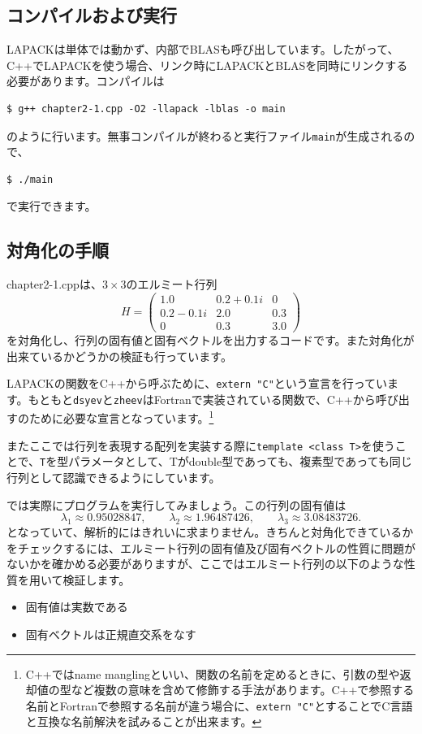 \documentclass[12pt]{jreport}
\begin{document}
\subsection{コンパイルおよび実行}
LAPACKは単体では動かず、内部でBLASも呼び出しています。したがって、C++でLAPACKを使う場合、リンク時にLAPACKとBLASを同時にリンクする必要があります。コンパイルは
\begin{lstlisting}[style=terminal]
  $ g++ chapter2-1.cpp -O2 -llapack -lblas -o main
\end{lstlisting}
のように行います。無事コンパイルが終わると実行ファイル\texttt{main}が生成されるので、
\begin{lstlisting}[style=terminal]
  $ ./main
\end{lstlisting}
で実行できます。

\subsection{対角化の手順}
chapter2-1.cppは、$3\times3$のエルミート行列
\begin{equation}
  H =
\begin{pmatrix}
1.0 & 0.2 + 0.1 i & 0 \\
0.2 - 0.1 i & 2.0 & 0.3 \\
0 & 0.3 & 3.0
\end{pmatrix}
\end{equation}
を対角化し、行列の固有値と固有ベクトルを出力するコードです。また対角化が出来ているかどうかの検証も行っています。

LAPACKの関数をC++から呼ぶために、\texttt{extern "C"}という宣言を行っています。もともと\texttt{dsyev}と\texttt{zheev}はFortranで実装されている関数で、C++から呼び出すのために必要な宣言となっています。\footnote[1]{C++ではname manglingといい、関数の名前を定めるときに、引数の型や返却値の型など複数の意味を含めて修飾する手法があります。C++で参照する名前とFortranで参照する名前が違う場合に、\texttt{extern "C"}とすることでC言語と互換な名前解決を試みることが出来ます。}

またここでは行列を表現する配列を実装する際に\texttt{template <class T>}を使うことで、\texttt{T}を型パラメータとして、Tがdouble型であっても、複素型であっても同じ行列として認識できるようにしています。


では実際にプログラムを実行してみましょう。この行列の固有値は
\begin{equation*}
  \lambda_1 \approx 0.95028847,\qquad
\lambda_2 \approx 1.96487426,\qquad
\lambda_3 \approx 3.08483726 .
\end{equation*}
となっていて、解析的にはきれいに求まりません。きちんと対角化できているかをチェックするには、エルミート行列の固有値及び固有ベクトルの性質に問題がないかを確かめる必要がありますが、ここではエルミート行列の以下のような性質を用いて検証します。
\begin{itemize}
  \item 固有値は実数である
  \item 固有ベクトルは正規直交系をなす
\end{itemize}
\end{document}

